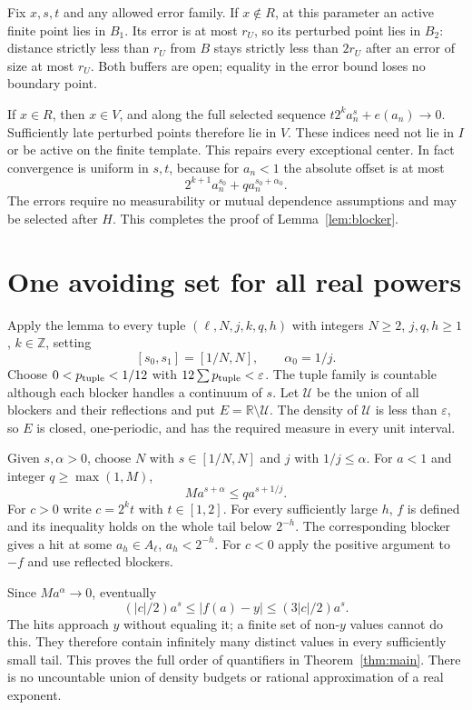 \documentclass[11pt,letterpaper]{article}
\newcommand{\R}{\mathbb R}
\newcommand{\Z}{\mathbb Z}
\begin{document}
Fix $x,s,t$ and any allowed error family. If $x\notin R$, at this parameter
an active finite point lies in $B_1$. Its error is at most $r_U$, so its perturbed
point lies in $B_2$: distance strictly less than $r_U$ from $B$ stays strictly
less than $2r_U$ after an error of size at most $r_U$. Both buffers are open;
equality in the error bound loses no boundary point.

If $x\in R$, then $x\in V$, and along the full selected sequence
$t2^ka_n^s+e(a_n)\to0$. Sufficiently late perturbed points therefore lie in $V$.
These indices need not lie in $I$ or be active on the finite template. This
repairs every exceptional center. In fact convergence is uniform in $s,t$,
because for $a_n<1$ the absolute offset is at most
\[
 2^{k+1}a_n^{s_0}+q a_n^{s_0+\alpha_0}.
\]
The errors require no measurability or mutual dependence assumptions and may
be selected after $H$. This completes the proof of Lemma~\ref{lem:blocker}.

\section{One avoiding set for all real powers}
Apply the lemma to every tuple $(\ell,N,j,k,q,h)$ with integers
$N\ge2$, $j,q,h\ge1$, $k\in\Z$, setting
\[
 [s_0,s_1]=[1/N,N],\qquad\alpha_0=1/j.
\]
Choose $0<p_{\rm tuple}<1/12$ with $12\sum p_{\rm tuple}<\varepsilon$.
The tuple family is countable although each blocker handles a continuum of
$s$. Let $\mathcal U$ be the union of all blockers and their reflections and
put $E=\R\setminus\mathcal U$. The density of $\mathcal U$ is less than
$\varepsilon$, so $E$ is closed, one-periodic, and has the required measure
in every unit interval.

Given $s,\alpha>0$, choose $N$ with $s\in[1/N,N]$ and $j$ with $1/j\le\alpha$.
For $a<1$ and integer $q\ge\max(1,M)$,
\[
 M a^{s+\alpha}\le q a^{s+1/j}.
\]
For $c>0$ write $c=2^kt$ with $t\in[1,2]$. For every sufficiently large $h$,
$f$ is defined and its inequality holds on the whole tail below $2^{-h}$.
The corresponding blocker gives a hit at some $a_h\in A_\ell$, $a_h<2^{-h}$.
For $c<0$ apply the positive argument to $-f$ and use reflected blockers.

Since $M a^\alpha\to0$, eventually
\[
 (|c|/2)a^s\le |f(a)-y|\le(3|c|/2)a^s.
\]
The hits approach $y$ without equaling it; a finite set of non-$y$ values
cannot do this. They therefore contain infinitely many distinct values in
 every sufficiently small tail. This proves the full order of quantifiers
in Theorem~\ref{thm:main}. There is no uncountable union of density budgets or
rational approximation of a real exponent.
\end{document}
